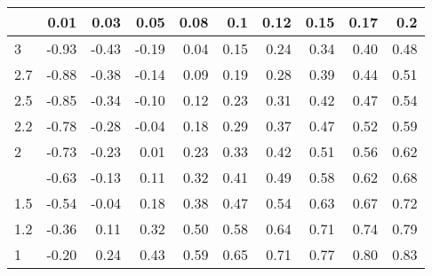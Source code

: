
\begin{tabular}{lrrrrrrrrr}
\toprule
  & 0.01 & 0.03 & 0.05 & 0.08 & 0.1 & 0.12 & 0.15 & 0.17 & 0.2\\
\midrule
3 & -0.93 & -0.43 & -0.19 & 0.04 & 0.15 & 0.24 & 0.34 & 0.40 & 0.48\\
2.7 & -0.88 & -0.38 & -0.14 & 0.09 & 0.19 & 0.28 & 0.39 & 0.44 & 0.51\\
2.5 & -0.85 & -0.34 & -0.10 & 0.12 & 0.23 & 0.31 & 0.42 & 0.47 & 0.54\\
2.2 & -0.78 & -0.28 & -0.04 & 0.18 & 0.29 & 0.37 & 0.47 & 0.52 & 0.59\\
2 & -0.73 & -0.23 & 0.01 & 0.23 & 0.33 & 0.42 & 0.51 & 0.56 & 0.62\\
\addlinespace
1.7 & -0.63 & -0.13 & 0.11 & 0.32 & 0.41 & 0.49 & 0.58 & 0.62 & 0.68\\
1.5 & -0.54 & -0.04 & 0.18 & 0.38 & 0.47 & 0.54 & 0.63 & 0.67 & 0.72\\
1.2 & -0.36 & 0.11 & 0.32 & 0.50 & 0.58 & 0.64 & 0.71 & 0.74 & 0.79\\
1 & -0.20 & 0.24 & 0.43 & 0.59 & 0.65 & 0.71 & 0.77 & 0.80 & 0.83\\
\bottomrule
\end{tabular}
